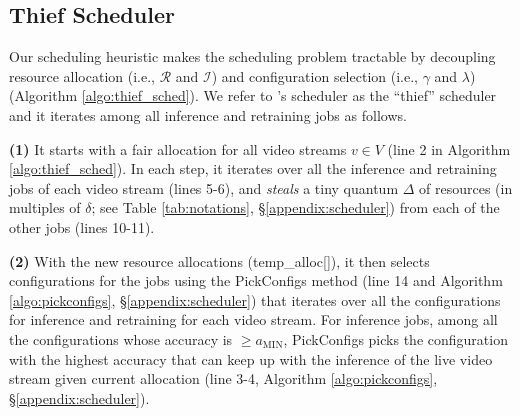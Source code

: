 \subsection{Thief Scheduler}
\label{subsec:thief}




Our scheduling heuristic makes the scheduling problem tractable by decoupling resource allocation (i.e., $\mathcal{R}$ and $\mathcal{I}$) and configuration selection (i.e., $\gamma$ and $\lambda$) (Algorithm \ref{algo:thief_sched}). %
We refer to {\name}'s scheduler as the ``thief'' scheduler and it iterates among all inference and retraining jobs as follows.%

{\bf (1)} It starts with a fair allocation for all video streams $v \in V$ (line 2 in Algorithm \ref{algo:thief_sched}). 
In each step, it iterates over all the inference and retraining jobs of each video stream (lines 5-6), and {\em steals} a tiny quantum $\Delta$ of resources (in multiples of $\delta$; see Table \ref{tab:notations}, \S\ref{appendix:scheduler}) from each of the other jobs (lines 10-11).

{\bf (2)} With the new resource allocations ({\small temp\_alloc[]}), it then selects configurations for the jobs using the {\sf\footnotesize PickConfigs} method (line 14 and Algorithm \ref{algo:pickconfigs}, \S{\ref{appendix:scheduler}}) that iterates over all the configurations for inference and retraining for each video stream.  
For inference jobs, among all the configurations whose accuracy is $\geq a_\text{MIN}$, {\sf\footnotesize PickConfigs} picks the configuration with the highest accuracy that can keep up with the inference of the live video stream given current allocation (line 3-4, Algorithm \ref{algo:pickconfigs}, \S{\ref{appendix:scheduler}}).  

